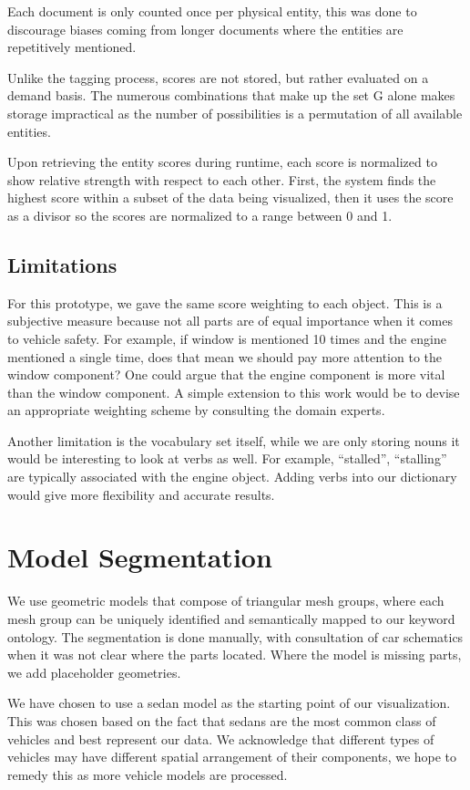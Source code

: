 Each document is only counted once per physical entity, this was done to
discourage biases coming from longer documents where the entities are
repetitively mentioned.

Unlike the tagging process, scores are not stored, but rather
evaluated on a demand basis. The numerous combinations that make up the set G
alone makes storage impractical as the number of possibilities is a permutation
of all available entities.
 
Upon retrieving the entity scores during runtime, each score is normalized
to show relative strength with respect to each other. First, the system finds
the highest score within a subset of the data being visualized, then it uses the
score as a divisor so the scores are normalized to a range between 0 and 1.

  
\subsection{Limitations} 
For this prototype, we gave the same score weighting to each object. This is a 
subjective measure because not all parts are of equal importance when it comes
to vehicle safety. For example, if window is mentioned 10 times and the engine mentioned a single time, does that mean we 
should pay more attention to the window component? One could argue that the engine 
component is more vital than the window component. A simple extension to this
work would be to devise an appropriate weighting scheme by consulting the domain
experts. 

Another limitation is the vocabulary set itself, while we are only storing nouns
it would be interesting to look at verbs as well. For example, ``stalled'',
``stalling'' are typically associated with the engine object. Adding verbs into
our dictionary would give more flexibility and accurate results.


\section{Model Segmentation}
We use geometric models that compose of triangular mesh groups, where each mesh 
group can be uniquely identified and semantically mapped to our keyword ontology. 
The segmentation is done manually, with consultation of car schematics when it 
was not clear where the parts located. Where the model is missing parts, 
we add placeholder geometries.

We have chosen to use a sedan model as the starting point of our visualization. 
This was chosen based on the fact that sedans are the most common class of 
vehicles and best represent our data. We acknowledge that different types of 
vehicles may have different spatial arrangement of their components, we hope to 
remedy this as more vehicle models are processed.


